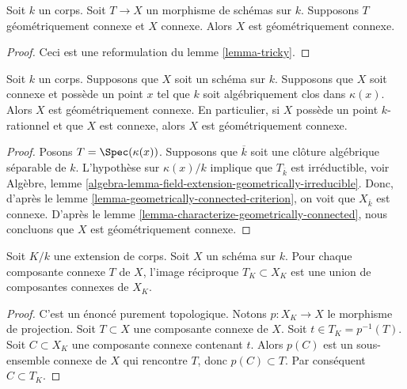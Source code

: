 \begin{lemma}
\label{lemma-geometrically-connected-criterion}
\begin{reference}
\cite[IV Corollary 4.5.13.1(i)]{EGA}
\end{reference}
Soit $k$ un corps. Soit $T \to X$ un
morphisme de schémas sur $k$. Supposons $T$
géométriquement connexe et $X$ connexe. Alors $X$ est géométriquement connexe.
\end{lemma}

\begin{proof}
Ceci est une reformulation
du lemme \ref{lemma-tricky}.
\end{proof}

\begin{lemma}
\label{lemma-geometrically-connected-if-connected-and-point}
Soit $k$ un corps. Supposons que $X$ soit
un schéma sur $k$. Supposons que $X$ soit connexe et
possède un point $x$ tel que $k$ soit algébriquement clos
dans $\kappa(x)$. Alors $X$ est géométriquement connexe.
En particulier, si $X$ possède un point $k$-rationnel et
que $X$ est connexe, alors $X$ est géométriquement connexe.
\end{lemma}

\begin{proof}
Posons $T = \Spec(\kappa(x))$. Supposons que
$\overline{k}$ soit une clôture algébrique séparable
de $k$. L'hypothèse sur $\kappa(x)/k$ implique que
$T_{\overline{k}}$ est irréductible, voir Algèbre, lemme
\ref{algebra-lemma-field-extension-geometrically-irreducible}.
Donc, d'après le lemme
\ref{lemma-geometrically-connected-criterion}, on voit que
$X_{\overline{k}}$ est connexe. D'après le lemme
\ref{lemma-characterize-geometrically-connected}, nous concluons que $X$ est géométriquement connexe.
\end{proof}

\begin{lemma}
\label{lemma-inverse-image-connected-component}
Soit $K/k$ une extension de corps.
Soit $X$ un schéma sur $k$. Pour chaque
composante connexe $T$ de $X$, l'image réciproque $T_K
\subset X_K$ est une union de composantes connexes de $X_K$.
\end{lemma}

\begin{proof}
C'est un énoncé purement topologique. Notons $p
: X_K \to X$ le morphisme de projection. Soit $T \subset
X$ une composante connexe de $X$. Soit $t \in T_K =
p^{-1}(T)$. Soit $C \subset X_K$ une composante connexe
contenant $t$. Alors $p(C)$ est un sous-ensemble connexe de $X$ qui
rencontre $T$, donc $p(C) \subset T$. Par conséquent $C \subset T_K$.
\end{proof}

